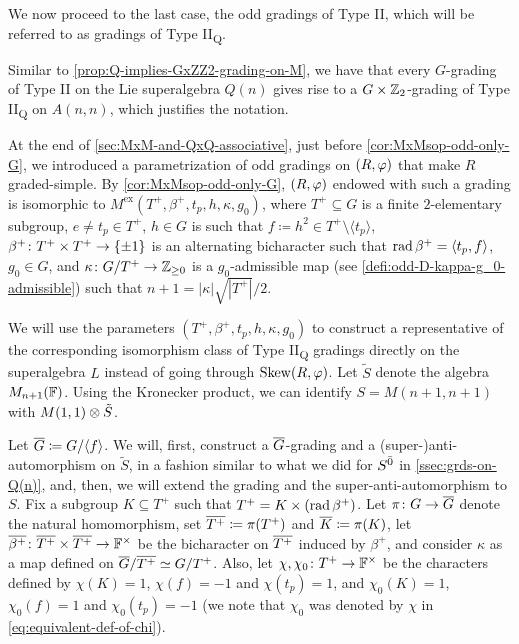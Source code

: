We now proceed to the last case, the odd gradings of Type II, which will be referred to as gradings of Type II\textsubscript{Q}. 

\begin{remark}\label{prop:Q-implies-GxZZ2-grading-on-M-II}
    Similar to \cref{prop:Q-implies-GxZZ2-grading-on-M}, we have that
    every $G$-grading of Type II on the Lie superalgebra $Q(n)$ gives rise to a $G\times \mathbb{Z}_2$-grading of Type II\textsubscript{Q} on $A(n,n)$, which justifies the notation.  
\end{remark}

At the end of \cref{sec:MxM-and-QxQ-associative}, just before \cref{cor:MxMsop-odd-only-G}, we introduced a parametrization of odd gradings on $(R, \varphi)$ that make $R$ graded-simple. 
By \cref{cor:MxMsop-odd-only-G}, $(R, \varphi)$ endowed with such a grading is isomorphic to $M^{\mathrm{ex}}(T^+, \beta^+, t_p, h, \kappa, g_0)$, where $T^+ \subseteq G$ is a finite $2$-elementary subgroup, $e\neq t_p \in T^+$, $h \in G$ is such that $f \coloneqq h^2 \in T^+ \setminus \langle t_p \rangle$, $\beta^+\colon T^+ \times T^+ \to \{ \pm 1 \}$ is an alternating bicharacter such that $\operatorname{rad} \beta^+ = \langle t_p, f \rangle$, $g_0\in G$, and $\kappa\colon G/T^+ \to \mathbb{Z}_{\geq 0}$ is a $g_0$-admissible map (see \cref{defi:odd-D-kappa-g_0-admissible}) such that $n+1 = |\kappa| \sqrt{|T^+|}/2$. 

We will use the parameters $(T^+, \beta^+, t_p, h, \kappa, g_0)$ to construct a representative of the corresponding isomorphism class of Type II\textsubscript{Q} gradings directly on the superalgebra $L$ instead of going through $\operatorname{Skew}(R, \varphi)$. 
Let $\tilde S$ denote the algebra $M_{n+1}(\mathbb{F})$. 
Using the Kronecker product, we can identify $S = M(n+1, n+1)$ with $M(1, 1) \otimes \tilde S$.

Let $\barr G \coloneqq G/\langle f \rangle$. 
We will, first, construct a $\barr G$-grading and a (super-)anti-automorphism on $\tilde S$, in a fashion similar to what we did for $S^{\bar0}$ in \cref{ssec:grds-on-Q(n)}, and, then, we will extend the grading and the super-anti-automorphism to $S$. 
Fix a subgroup $K \subseteq T^+$ such that $T^+ = K \times (\operatorname{rad} \beta^+)$. 
Let $\pi\from G \to \barr G$ denote the natural homomorphism, set $\barr {T^+} \coloneqq \pi(T^+)$ and $\barr {K} \coloneqq \pi(K)$, let $\barr {\beta^+}\from \barr {T^+} \times \barr {T^+} \to \FF^\times$ be the bicharacter on $\barr {T^+}$ induced by $\beta^+$, and consider $\kappa$ as a map defined on $\barr G/\barr {T^+} \iso G/{T^+}$. 
Also, let $\chi,\chi_0 \colon T^+ \to \mathbb{F}^\times$ be the characters defined by $\chi(K) = 1$, $\chi(f) = -1$ and $\chi(t_p) = 1$, and $\chi_0(K) = 1$, $\chi_0(f) = 1$ and $\chi_0(t_p) = -1$ (we note that $\chi_0$ was denoted by $\chi$ in \cref{eq:equivalent-def-of-chi}). 

